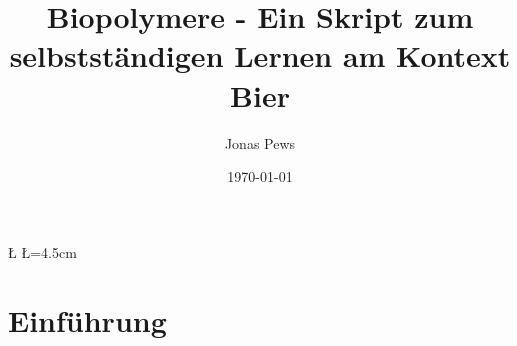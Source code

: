 \documentclass{scrartcl}  %
\author{Jonas Pews}
\title{Biopolymere - Ein Skript zum selbstständigen Lernen am Kontext Bier}
\date{\today}
\begin{document}
%
		
		\renewcommand{\D}{5} %
		\renewcommand{\U}{6} %
		\newdimen\R %
		\R=3.5cm 
		\newdimen\L %
		\L=4.5cm
		\renewcommand{\A}{360/\D} %




	\maketitle
	
	\begin{center}
		\ccbyncsa
	\end{center}
	

\pagebreak

	\renewcommand{\contentsname}{Inhaltsverzeichnis}  %
	\tableofcontents

\pagebreak

	\section{Einführung}
\end{document}
